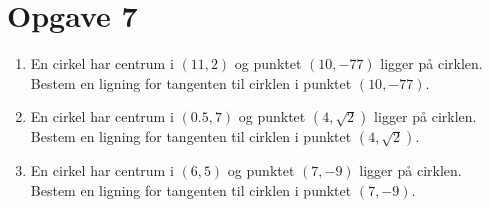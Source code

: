 \section*{Opgave 7}
\begin{enumerate}[label=\roman*)]
	\item En cirkel har centrum i $(11,2)$ og punktet $(10,-77)$ ligger på cirklen. Bestem en ligning for tangenten til 
	cirklen i punktet $(10,-77)$.
	\item En cirkel har centrum i $(0.5,7)$ og punktet $(4,\sqrt{2})$ ligger på cirklen. Bestem en ligning for
	tangenten til cirklen i punktet $(4,\sqrt{2})$.
	\item En cirkel har centrum i $(6,5)$ og punktet $(7,-9)$ ligger på cirklen. Bestem en ligning for tangenten til 
	cirklen i punktet $(7,-9)$.
\end{enumerate}